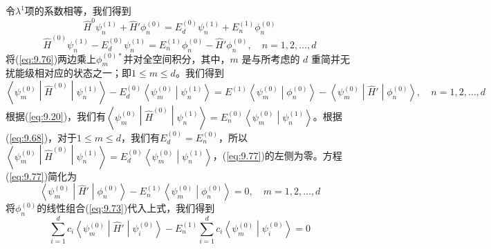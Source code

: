     令$\lambda^1$项的系数相等，我们得到
    \begin{equation*}
        \hat{H}^0\psi_n^{\left(1\right)} + \hat{H}'\phi_n^{\left(0\right)} = E_d^{\left(0\right)}\psi_n^{\left(1\right)} + E_n^{\left(1\right)}\phi_n^{\left(0\right)}
    \end{equation*}
    \begin{equation}
        \hat{H}^{\left(0\right)}\psi_n^{\left(1\right)} - E_d^{\left(0\right)}\psi_n^{\left(1\right)} = E_n^{\left(1\right)}\phi_n^{\left(0\right)} - \hat{H}'\phi_n^{\left(0\right)}, \quad n = 1,2,\ldots,d
        \label{eq:9.76}
    \end{equation}
    将(\ref{eq:9.76})两边乘上$\phi_m^{\left(0\right)*}$并对全空间积分，其中，$m$ 是与所考虑的 $d$ 重简并无扰能级相对应的状态之一；即$1 \leq m \leq d$。我们得到
    \begin{equation}
        \left\langle \psi_m^{\left(0\right)} \middle| \hat{H}^{\left(0\right)} \middle| \psi_n^{\left(1\right)} \right\rangle - E_d^{\left(0\right)} \left\langle \psi_m^{\left(0\right)} \middle| \psi_n^{\left(1\right)} \right\rangle = E^{\left(1\right)}\left\langle \psi_m^{\left(0\right)} \middle| \phi_n^{\left(0\right)} \right\rangle - \left\langle \psi_m^{\left(0\right)} \middle| \hat{H}' \middle| \phi_n^{\left(0\right)} \right\rangle, \quad n = 1,2,\ldots,d
        \label{eq:9.77}
    \end{equation}
    根据(\ref{eq:9.20})，我们有$\left\langle \psi_m^{\left(0\right)} \middle| \hat{H}^{\left(0\right)} \middle| \psi_n^{\left(1\right)} \right\rangle = E_n^{\left(0\right)}\left\langle \psi_m^{\left(0\right)} \middle| \psi_n^{\left(1\right)} \right\rangle$。根据(\ref{eq:9.68})，对于$1 \leq m \leq d$，我们有$E_d^{\left(0\right)} = E_n^{\left(0\right)}$，所以$\left\langle \psi_m^{\left(0\right)} \middle| \hat{H}^{\left(0\right)} \middle| \psi_n^{\left(1\right)} \right\rangle = E_d^{\left(0\right)}\left\langle \psi_m^{\left(0\right)} \middle| \psi_n^{\left(1\right)} \right\rangle$，(\ref{eq:9.77})的左侧为零。方程(\ref{eq:9.77})简化为
    \begin{equation*}
        \left\langle \psi_m^{\left(0\right)} \middle| \hat{H}' \middle| \phi_n^{\left(0\right)} \right\rangle - E_n^{\left(1\right)} \left\langle \psi_m^{\left(0\right)} \middle| \phi_n^{\left(0\right)} \right\rangle = 0, \quad m = 1,2,\ldots,d
    \end{equation*}
    将$\phi_n^{\left(0\right)}$的线性组合(\ref{eq:9.73})代入上式，我们得到
    \begin{equation}
        \sum_{i=1}^{d}c_i\left\langle \psi_m^{\left(0\right)} \middle| \hat{H}' \middle| \psi_i^{\left(0\right)} \right\rangle - E_n^{\left(1\right)} \sum_{i=1}^{d}c_i\left\langle \psi_m^{\left(0\right)} \middle| \psi_i^{\left(0\right)} \right\rangle = 0
        \label{eq:9.78}
    \end{equation}
